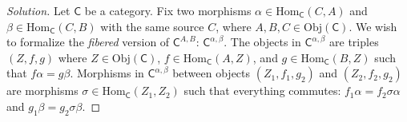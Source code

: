 \documentclass[fontsize=14pt]{scrartcl}
\theoremstyle{definition}
\newenvironment{solution}{
  \begin{proof}[Solution]
  \vspace{-8px}
  \setlength{\parskip}{4px}
  \setlength{\parindent}{0px}
}{
  \end{proof}
}
\newcommand{\Obj}{\mathrm{Obj}}
\newcommand{\Hom}{\mathrm{Hom}}
\begin{document}
\begin{solution}
\def \C {\mathsf{C}}
\def \Call {\C^{\alpha,\beta}}
\def \Cobj {\C^{A,B}}

Let $\C$ be a category. Fix two morphisms $\alpha\in\Hom_\C(C,A)$ and
$\beta\in\Hom_\C(C,B)$ with the same source $C$, where $A,B,C\in\Obj(\C)$. We
wish to formalize the \textit{fibered} version of $\C^{A,B}$: $\Call$. The
objects in $\Call$ are triples $(Z,f,g)$ where $Z\in\Obj(\C)$,
$f\in\Hom_\C(A,Z)$, and $g\in\Hom_\C(B,Z)$ such that $f\alpha = g\beta$.
Morphisms in $\Call$ between objects $(Z_1,f_1,g_2)$ and $(Z_2,f_2,g_2)$ are
morphisms $\sigma\in\Hom_\C(Z_1,Z_2)$ such that everything commutes: $f_1\alpha
= f_2\sigma\alpha$ and $g_1\beta = g_2\sigma\beta$.

\end{solution}
\end{document}
